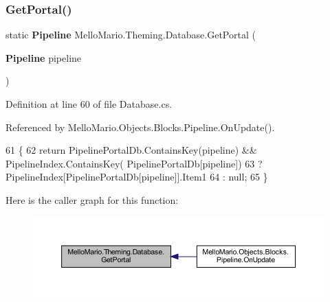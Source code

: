\mbox{\label{classMelloMario_1_1Theming_1_1Database_aa993391b45238e267030c9103d64fa89}} 
\subsubsection{Get\+Portal()}
{\footnotesize\ttfamily static \textbf{ Pipeline} Mello\+Mario.\+Theming.\+Database.\+Get\+Portal (\begin{DoxyParamCaption}\item[{\textbf{ Pipeline}}]{pipeline }\end{DoxyParamCaption})\hspace{0.3cm}{\ttfamily [static]}}



Definition at line 60 of file Database.\+cs.



Referenced by Mello\+Mario.\+Objects.\+Blocks.\+Pipeline.\+On\+Update().


\begin{DoxyCode}
61         \{
62             \textcolor{keywordflow}{return} PipelinePortalDb.ContainsKey(pipeline) && PipelineIndex.ContainsKey(
      PipelinePortalDb[pipeline])
63                 ? PipelineIndex[PipelinePortalDb[pipeline]].Item1
64                 : null;
65         \}
\end{DoxyCode}
Here is the caller graph for this function\+:
\nopagebreak
\begin{figure}[H]
\begin{center}
\leavevmode
\includegraphics[width=350pt]{classMelloMario_1_1Theming_1_1Database_aa993391b45238e267030c9103d64fa89_icgraph}
\end{center}
\end{figure}
\mbox{\label{classMelloMario_1_1Theming_1_1Database_a847b37218838dfb96413ba40edcebca3}} 
